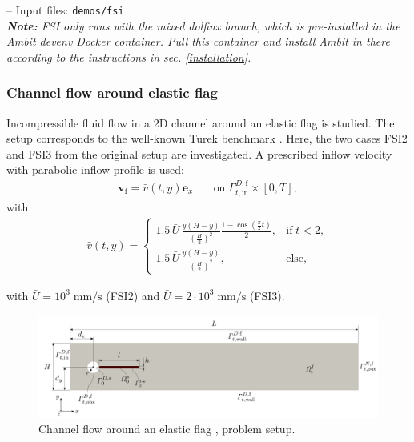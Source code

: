 \documentclass[a4paper,12pt]{report}
\newcommand{\fF}{\text{f}}
\newcommand{\bs}[1]{\boldsymbol{#1}}
\newcommand{\Gm}{\mathit{\Gamma}}
\newcommand{\vf}{\bs{v}_{\fF}} %
\begin{document}
-- Input files: \verb"demos/fsi"\\

\textit{\textbf{Note:} FSI only runs with the mixed dolfinx branch, which is pre-installed in the Ambit devenv Docker container. Pull this container and install Ambit in there according to the instructions in sec. \ref{installation}.}

\subsubsection*{Channel flow around elastic flag}

Incompressible fluid flow in a 2D channel around an elastic flag is studied. The setup corresponds to the well-known Turek benchmark \cite{turek2006}. Here, the two cases FSI2 and FSI3 from the original setup are investigated. A prescribed inflow velocity with parabolic inflow profile is used:\\
\begin{equation}
\begin{aligned}
    \vf = \bar{v}(t,y) \bs{e}_{x}
    \quad &  
    \text{on}\; \Gm_{t,\mathrm{in}}^{D,\fF} \times [0,T],
    \label{eq:flag_dbc_in}
\end{aligned}
\end{equation}
with 
\begin{equation}
\begin{aligned}
    \bar{v}(t,y) = \begin{cases} 1.5 \,\bar{U}\, \frac{y(H-y)}{\left(\frac{H}{2}\right)^2} \frac{1-\cos\left(\frac{\pi}{2}t\right)}{2}, & \text{if} \; t < 2, \\ 1.5 \,\bar{U}\, \frac{y(H-y)}{\left(\frac{H}{2}\right)^2}, & \text{else}, \end{cases}
    \label{eq:flag_dbcs_func}
\end{aligned}
\end{equation}

with $\bar{U}=10^{3}\;\mathrm{mm}/\mathrm{s}$ (FSI2) and $\bar{U}=2\cdot 10^{3}\;\mathrm{mm}/\mathrm{s}$ (FSI3).\\

\begin{figure}
\centering
\includegraphics[width=1.0\textwidth]{fig/channel_flag_setup.png}
\caption{Channel flow around an elastic flag \cite{turek2006}, problem setup.}
\label{fig:channel_flag_setup}
\end{figure}
\end{document}
